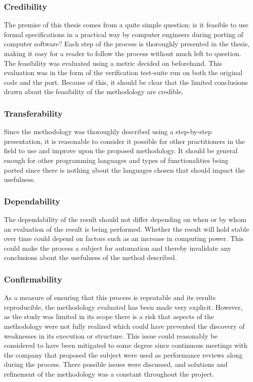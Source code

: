\subsubsection{Credibility}
The premise of this thesis comes from a quite simple question: is it feasible to use formal specifications in a practical way by computer engineers during porting of computer software? Each step of the process is thoroughly presented in the thesis, making it easy for a reader to follow the process without much left to question. The feasibility was evaluated using a metric decided on beforehand. This evaluation was in the form of the verification test-suite run on both the original code and the port. Because of this, it should be clear that the limited conclusions drawn about the feasibility of the methodology are credible.

\subsubsection{Transferability}
Since the methodology was thoroughly described using a step-by-step presentation, it is reasonable to consider it possible for other practitioners in the field to use and improve upon the proposed methodology. It should be general enough for other programming languages and types of functionalities being ported since there is nothing about the languages chosen that should impact the usefulness.

\subsubsection{Dependability}
The dependability of the result should not differ depending on when or by whom an evaluation of the result is being performed. Whether the result will hold stable over time could depend on factors such as an increase in computing power. This could make the process a subject for automation and thereby invalidate any conclusions about the usefulness of the method described. 

\subsubsection{Confirmability}
As a measure of ensuring that this process is repeatable and its results reproducible, the methodology evaluated has been made very explicit. However, as the study was limited in its scope there is a risk that aspects of the methodology were not fully realized which could have prevented the discovery of weaknesses in its execution or structure. This issue could reasonably be considered to have been mitigated to some degree since continuous meetings with the company that proposed the subject were used as performance reviews along during the process. There possible issues were discussed, and solutions and refinement of the methodology was a constant throughout the project.

